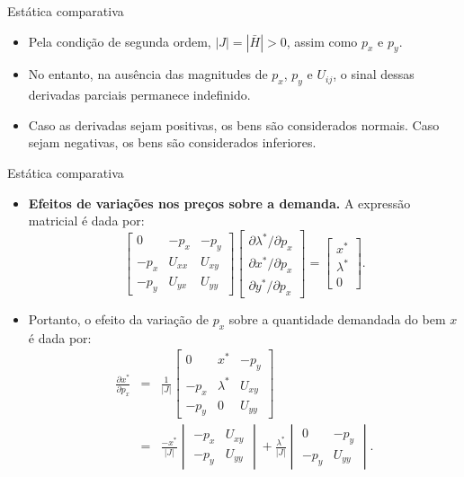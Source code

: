 \documentclass[10pt]{beamer}
\begin{document}
\begin{frame}{Estática comparativa}
\begin{itemize}
    \item Pela condição de segunda ordem, $|J| = |\bar{H}| > 0$, assim como $p_x$ e $p_y$.
    \bigskip
    \item No entanto, na ausência das magnitudes de $p_x$, $p_y$ e $U_{ij}$, o sinal dessas derivadas parciais permanece indefinido.
    \bigskip
    \item Caso as derivadas sejam positivas, os bens são considerados normais. Caso sejam negativas, os bens são considerados inferiores.
\end{itemize}
\end{frame}

\begin{frame}{Estática comparativa}
\begin{itemize}
    \item \textbf{Efeitos de variações nos preços sobre a demanda.} A expressão matricial é dada por:
    \begin{equation}
        \begin{bmatrix}
            0 & -p_x & -p_y \\ -p_x & U_{xx} & U_{xy} \\ -p_y & U_{yx} & U_{yy}
        \end{bmatrix} \begin{bmatrix}
            \partial \lambda^*/\partial p_x \\ \partial x^*/\partial p_x \\ \partial y^*/\partial p_x
        \end{bmatrix} = \begin{bmatrix}
            x^* \\ \lambda^* \\ 0
        \end{bmatrix}.
    \end{equation}
    \bigskip
    \item Portanto, o efeito da variação de $p_x$ sobre a quantidade demandada do bem $x$ é dada por:
    \begin{eqnarray}
    \frac{\partial x^*}{\partial p_x} &=& \frac{1}{|J|}\begin{bmatrix}
    0 & x^* & -p_y \\
    -p_x & \lambda^* & U_{xy} \\
    -p_y & 0 & U_{yy}
    \end{bmatrix} \nonumber \\ &=& \frac{-x^*}{|J|}\begin{vmatrix}
    -p_x & U_{xy} \\ -p_y & U_{yy}
    \end{vmatrix} + \frac{\lambda^*}{|J|}\begin{vmatrix}
    0 & -p_y \\ -p_y & U_{yy}
    \end{vmatrix}.
    \label{eq8}
    \end{eqnarray}
\end{itemize}
\end{frame}
\end{document}
